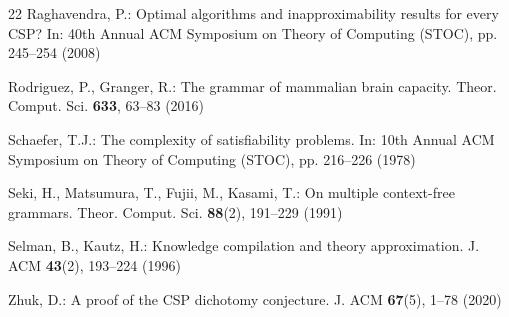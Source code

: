 \documentclass[runningheads]{llncs}
\begin{document}
\begin{thebibliography}{22}
Raghavendra, P.: Optimal algorithms and inapproximability results for every CSP? In: 40th Annual ACM Symposium on Theory of Computing (STOC), pp. 245--254 (2008)

Rodriguez, P., Granger, R.: The grammar of mammalian brain capacity. Theor. Comput. Sci. \textbf{633}, 63--83 (2016)

Schaefer, T.J.: The complexity of satisfiability problems. In: 10th Annual ACM Symposium on Theory of Computing (STOC), pp. 216--226 (1978)

Seki, H., Matsumura, T., Fujii, M., Kasami, T.: On multiple context-free grammars. Theor. Comput. Sci. \textbf{88}(2), 191--229 (1991)

Selman, B., Kautz, H.: Knowledge compilation and theory approximation. J. ACM \textbf{43}(2), 193--224 (1996)

Zhuk, D.: A proof of the CSP dichotomy conjecture. J. ACM \textbf{67}(5), 1--78 (2020)

\end{thebibliography}
\end{document}
